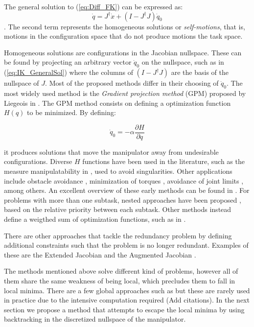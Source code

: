 \documentclass[conference]{IEEEtran}
\newcommand{\J}{\ensuremath{J}}
\newcommand{\Jps}{\ensuremath{J^{\dagger}}}
\newcommand{\dx}{\ensuremath{\dot{x}}}
\newcommand{\dq}{\ensuremath{\dot{q}}}
\newcommand{\q}{\ensuremath{q}}
\begin{document}
The general solution to (\ref{eq:Diff_FK}) can be expressed as:
\begin{equation}
\dq = \Jps \dx + (I - \Jps \J)\dq_{0}
\label{eq:IK_GeneralSol}
\end{equation}
. The second term represents the homogeneous solutions or \textit{self-motions}, that is, motions 
in the configuration space that do not produce motions the task space. 

Homogeneous solutions are configurations in the Jacobian nullspace. These can be found by projecting 
an arbitrary vector $\dq_{0}$ on the nullspace, such as in (\ref{eq:IK_GeneralSol}) where the columns 
of $(I - \Jps \J)$ are the basis of the nullspace of $\J$. Most of the proposed methods differ in 
their choosing of $\dq_{0}$. The most widely used method is the \textit{Gradient projection method} 
(GPM) proposed by Liegeois in \cite{liegeois-ns-1977}. The GPM method consists on defining a 
optimization function $H(\q)$ to be minimized. By defining:

\begin{equation}
\dq_{0} = -\alpha \dfrac{\partial H}{\partial \q}
\end{equation}

it produces solutions that move the manipulator away from undesirable configurations. 
Diverse $H$ functions have been used in the literature, such as the measure manipulatability
 in \cite{yoshikawa-ns-1985}, used to avoid singularities. Other applications include obstacle
avoidance \cite{klein-ns-1985}, minimization of torques \cite{hollerbach-ns-1985}, avoidance
of joint limits \cite{liegeois-ns-1977}, among others. An excellent overview of these early
methods can be found in \cite{siciliano-ns-1990}. For problems with more than one subtask,
nested approaches have been proposed \cite{chiaverini-ns-1997}\cite{nakamura-ns-1987}, 
based on the relative priority between each subtask. Other methods instead define a weigthed
sum of optimization functions, such as in \cite{buss-ns-2006}. 

There are other approaches that tackle the redundancy problem by defining additional constraints
 such that the problem is no longer redundant. Examples of these are the Extended Jacobian 
\cite{baillieul-ns-1985} and the Augmented Jacobian \cite{sciavicco-ns-1988}\cite{egeland-ns-1987}. 

The methods mentioned above solve different kind of problems, however all of them share the same 
weakness of being local, which precludes them to fall in local minima. There are a few global 
approaches such as  but these are rarely used in practice due to the intensive computation required
(Add citations). In the next section we propose a method that attempts to escape the local minima by 
using backtracking in the discretized nullspace of the manipulator.
\end{document}
